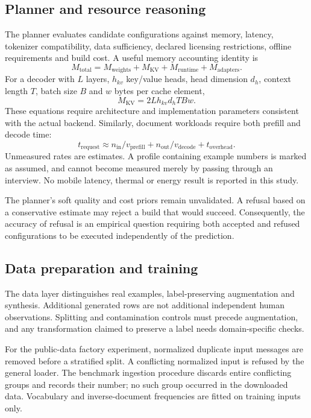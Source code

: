 \documentclass[11pt,a4paper]{article}
\begin{document}
\subsection{Planner and resource reasoning}
The planner evaluates candidate configurations against memory, latency,
tokenizer compatibility, data sufficiency, declared licensing restrictions,
offline requirements and build cost. A useful memory accounting identity is
\begin{equation}
M_{\mathrm{total}}=M_{\mathrm{weights}}+M_{\mathrm{KV}}+
M_{\mathrm{runtime}}+M_{\mathrm{adapters}}.
\end{equation}
For a decoder with $L$ layers, $h_{kv}$ key/value heads, head dimension $d_h$,
context length $T$, batch size $B$ and $w$ bytes per cache element,
\begin{equation}
M_{\mathrm{KV}}=2Lh_{kv}d_hTBw.
\end{equation}
These equations require architecture and implementation parameters consistent
with the actual backend. Similarly, document workloads require both prefill
and decode time:
\begin{equation}
t_{\mathrm{request}}\approx n_{\mathrm{in}}/v_{\mathrm{prefill}}
+n_{\mathrm{out}}/v_{\mathrm{decode}}+t_{\mathrm{overhead}}.
\end{equation}
Unmeasured rates are estimates. A profile containing example numbers is marked
as assumed, and cannot become measured merely by passing through an interview.
No mobile latency, thermal or energy result is reported in this study.

The planner's soft quality and cost priors remain unvalidated. A refusal based
on a conservative estimate may reject a build that would succeed. Consequently,
the accuracy of refusal is an empirical question requiring both accepted and
refused configurations to be executed independently of the prediction.

\subsection{Data preparation and training}
The data layer distinguishes real examples, label-preserving augmentation and
synthesis. Additional generated rows are not additional independent human
observations. Splitting and contamination controls must precede augmentation,
and any transformation claimed to preserve a label needs domain-specific checks.

For the public-data factory experiment, normalized duplicate input messages are
removed before a stratified split. A conflicting normalized input is refused by
the general loader. The benchmark ingestion procedure discards entire conflicting
groups and records their number; no such group occurred in the downloaded data.
Vocabulary and inverse-document frequencies are fitted on training inputs only.
\end{document}
